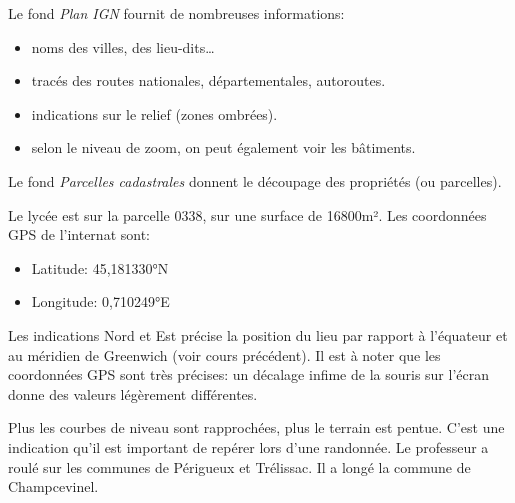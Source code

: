 \documentclass[a4paper,11pt]{article}
\begin{document}
\begin{activite}
    Le fond \emph{Plan IGN} fournit de nombreuses informations:
    \begin{itemize}
        \item noms des villes, des lieu-dits\dots
        \item tracés des routes nationales, départementales, autoroutes.
        \item indications sur le relief (zones ombrées).
        \item selon le niveau de zoom, on peut également voir les bâtiments.
    \end{itemize}
Le fond \emph{Parcelles cadastrales} donnent le découpage des propriétés (ou parcelles).
\end{activite}
\begin{activite}
Le lycée est sur la parcelle 0338, sur une surface de 16800m². Les coordonnées GPS de l'internat sont:
\begin{itemize}
    \item Latitude: 45,181330°N
    \item Longitude: 0,710249°E
\end{itemize}
Les indications Nord et Est précise la position du lieu par rapport à l'équateur et au méridien de Greenwich (voir cours précédent). Il est à noter que les coordonnées GPS sont très précises: un décalage infime de la souris sur l'écran donne des valeurs légèrement différentes.
\end{activite}
\begin{activite}
Plus les courbes de niveau sont rapprochées, plus le terrain est pentue. C'est une indication qu'il est important de repérer lors d'une randonnée. Le professeur a roulé sur les communes de Périgueux et Trélissac. Il a longé la commune de Champcevinel.
\end{activite}
\end{document}
